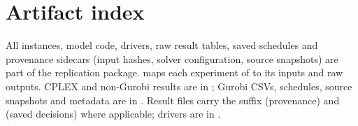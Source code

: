 \appendix
\section{Artifact index}
\label{app:artifacts}

All instances, model code, drivers, raw result tables, saved schedules and
provenance sidecars (input hashes, solver configuration, source snapshots) are
part of the replication package.  maps each experiment of
 to its inputs and raw outputs. CPLEX and non-Gurobi
results are in ; Gurobi CSVs, schedules, source snapshots
and metadata are in . Result files carry the suffix
 (provenance) and  (saved decisions)
where applicable; drivers are in .

